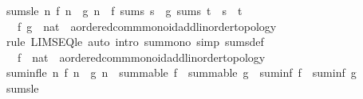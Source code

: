 \begin{isabellebody}
{\isafolddocument}%
%
\isadelimdocument
%
\endisadelimdocument
{}\isamarkupfalse%
\ sums{\isacharunderscore}{\kern0pt}le{\isacharcolon}{\kern0pt}\ {\isachardoublequoteopen}{\isacharparenleft}{\kern0pt}{\isasymAnd}n{\isachardot}{\kern0pt}\ f\ n\ {\isasymle}\ g\ n{\isacharparenright}{\kern0pt}\ {\isasymLongrightarrow}\ f\ sums\ s\ {\isasymLongrightarrow}\ g\ sums\ t\ {\isasymLongrightarrow}\ s\ {\isasymle}\ t{\isachardoublequoteclose}\isanewline
\ \ \ f\ g\ {\isacharcolon}{\kern0pt}{\isacharcolon}{\kern0pt}\ {\isachardoublequoteopen}nat\ {\isasymRightarrow}\ {\isacharprime}{\kern0pt}a{\isacharcolon}{\kern0pt}{\isacharcolon}{\kern0pt}{\isacharbraceleft}{\kern0pt}ordered{\isacharunderscore}{\kern0pt}comm{\isacharunderscore}{\kern0pt}monoid{\isacharunderscore}{\kern0pt}add{\isacharcomma}{\kern0pt}linorder{\isacharunderscore}{\kern0pt}topology{\isacharbraceright}{\kern0pt}{\isachardoublequoteclose}\isanewline
%
\isadelimproof
\ \ %
\endisadelimproof
%
\isatagproof
{}\isamarkupfalse%
\ {\isacharparenleft}{\kern0pt}rule\ LIMSEQ{\isacharunderscore}{\kern0pt}le{\isacharparenright}{\kern0pt}\ {\isacharparenleft}{\kern0pt}auto\ intro{\isacharcolon}{\kern0pt}\ sum{\isacharunderscore}{\kern0pt}mono\ simp{\isacharcolon}{\kern0pt}\ sums{\isacharunderscore}{\kern0pt}def{\isacharparenright}{\kern0pt}%
\endisatagproof
{\isafoldproof}%
%
\isadelimproof
\isanewline
%
\endisadelimproof
\isanewline
{}\isamarkupfalse%
\isanewline
\ \ \ f\ {\isacharcolon}{\kern0pt}{\isacharcolon}{\kern0pt}\ {\isachardoublequoteopen}nat\ {\isasymRightarrow}\ {\isacharprime}{\kern0pt}a{\isacharcolon}{\kern0pt}{\isacharcolon}{\kern0pt}{\isacharbraceleft}{\kern0pt}ordered{\isacharunderscore}{\kern0pt}comm{\isacharunderscore}{\kern0pt}monoid{\isacharunderscore}{\kern0pt}add{\isacharcomma}{\kern0pt}linorder{\isacharunderscore}{\kern0pt}topology{\isacharbraceright}{\kern0pt}{\isachardoublequoteclose}\isanewline
{}\isanewline
\isanewline
{}\isamarkupfalse%
\ suminf{\isacharunderscore}{\kern0pt}le{\isacharcolon}{\kern0pt}\ {\isachardoublequoteopen}{\isacharparenleft}{\kern0pt}{\isasymAnd}n{\isachardot}{\kern0pt}\ f\ n\ {\isasymle}\ g\ n{\isacharparenright}{\kern0pt}\ {\isasymLongrightarrow}\ summable\ f\ {\isasymLongrightarrow}\ summable\ g\ {\isasymLongrightarrow}\ suminf\ f\ {\isasymle}\ suminf\ g{\isachardoublequoteclose}\isanewline
%
\isadelimproof
\ \ %
\endisadelimproof
%
\isatagproof
{}\isamarkupfalse%
\ sums{\isacharunderscore}{\kern0pt}le\ \isamarkupfalse%

\end{isabellebody}
